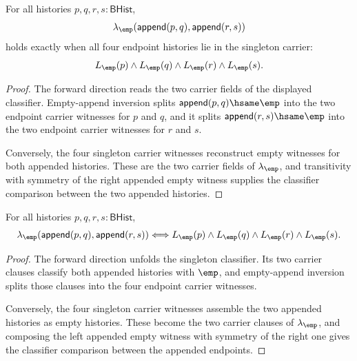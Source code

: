 \begin{theorem}
\label{thm:linearmap-singleton-classifier-append-pair-carrier}
For all histories $p,q,r,s:\mathsf{BHist}$,
$$
\lambda_{\emp}(\mathsf{append}(p,q),\mathsf{append}(r,s))
$$
holds exactly when all four endpoint histories lie in the singleton carrier:
$$
L_{\emp}(p)\land L_{\emp}(q)\land L_{\emp}(r)\land L_{\emp}(s).
$$
\end{theorem}
\begin{proof}
The forward direction reads the two carrier fields of the displayed
classifier. Empty-append inversion splits
$\mathsf{append}(p,q)\hsame\emp$ into the two endpoint carrier witnesses
for $p$ and $q$, and it splits
$\mathsf{append}(r,s)\hsame\emp$ into the two endpoint carrier witnesses
for $r$ and $s$.

Conversely, the four singleton carrier witnesses reconstruct empty witnesses
for both appended histories. These are the two carrier fields of
$\lambda_{\emp}$, and transitivity with symmetry of the right appended
empty witness supplies the classifier comparison between the two appended
histories.
\end{proof}

\begin{theorem}
\label{thm:linearmap-singleton-classifier-append-pair-empty}
For all histories $p,q,r,s:\mathsf{BHist}$,
$$
\lambda_{\emp}(\mathsf{append}(p,q),\mathsf{append}(r,s))
\Longleftrightarrow
L_{\emp}(p)\wedge L_{\emp}(q)\wedge L_{\emp}(r)\wedge L_{\emp}(s).
$$
\end{theorem}
\begin{proof}
The forward direction unfolds the singleton classifier. Its two carrier
clauses classify both appended histories with $\emp$, and empty-append
inversion splits those clauses into the four endpoint carrier witnesses.

Conversely, the four singleton carrier witnesses assemble the two appended
histories as empty histories. These become the two carrier clauses of
$\lambda_{\emp}$, and composing the left appended empty witness with symmetry
of the right one gives the classifier comparison between the appended
endpoints.
\end{proof}

